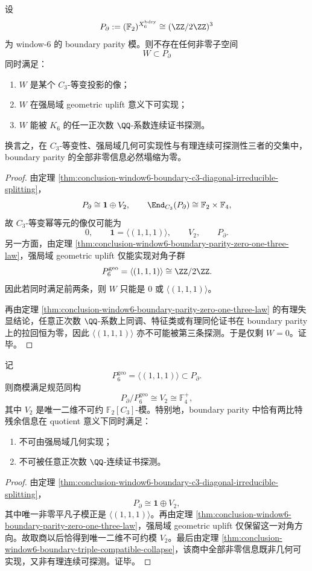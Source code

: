 \begin{theorem}\label{thm:conclusion-window6-boundary-triple-compatible-collapse}
设
\[
P_{\partial}:=(\mathbb F_2)^{X_6^{\mathrm{bdry}}}\cong (\ZZ/2\ZZ)^3
\]
为 window-\(6\) 的 boundary parity 模。则不存在任何非零子空间
\[
W\subset P_{\partial}
\]
同时满足：
\begin{enumerate}
  \item \(W\) 是某个 \(C_3\)-等变投影的像；
  \item \(W\) 在强局域 geometric uplift 意义下可实现；
  \item \(W\) 能被 \(K_6\) 的任一正次数 \(\QQ\)-系数连续证书探测。
\end{enumerate}
换言之，在 \(C_3\)-等变性、强局域几何可实现性与有理连续可探测性三者的交集中，boundary parity 的全部非零信息必然塌缩为零。
\end{theorem}
\begin{proof}
由定理 \ref{thm:conclusion-window6-boundary-c3-diagonal-irreducible-splitting}，
\[
P_{\partial}\cong \mathbf 1\oplus V_2,
\qquad
\End_{C_3}(P_{\partial})\cong \mathbb F_2\times \mathbb F_4,
\]
故 \(C_3\)-等变幂等元的像仅可能为
\[
0,\qquad \mathbf 1=\langle(1,1,1)\rangle,\qquad V_2,\qquad P_{\partial}.
\]
另一方面，由定理 \ref{thm:conclusion-window6-boundary-parity-zero-one-three-law}，强局域 geometric uplift 仅能实现对角子群
\[
P_6^{\mathrm{geo}}=\langle(1,1,1)\rangle\cong \ZZ/2\ZZ.
\]
因此若同时满足前两条，则 \(W\) 只能是 \(0\) 或 \(\langle(1,1,1)\rangle\)。

再由定理 \ref{thm:conclusion-window6-boundary-parity-zero-one-three-law} 的有理失显结论，任意正次数 \(\QQ\)-系数上同调、特征类或有理同伦证书在 boundary parity 上的拉回恒为零，因此 \(\langle(1,1,1)\rangle\) 亦不可能被第三条探测。于是仅剩 \(W=0\)。证毕。
\end{proof}

\begin{corollary}[唯一二维不可约不可见商]\label{cor:conclusion-window6-boundary-unique-invisible-v2-quotient}
记
\[
P_6^{\mathrm{geo}}=\langle(1,1,1)\rangle\subset P_{\partial}.
\]
则商模满足规范同构
\[
P_{\partial}/P_6^{\mathrm{geo}}\cong V_2\cong \mathbb F_4^+,
\]
其中 \(V_2\) 是唯一二维不可约 \(\mathbb F_2[C_3]\)-模。特别地，boundary parity 中恰有两比特残余信息在 quotient 意义下同时满足：
\begin{enumerate}
  \item 不可由强局域几何实现；
  \item 不可被任意正次数 \(\QQ\)-连续证书探测。
\end{enumerate}
\end{corollary}
\begin{proof}
由定理 \ref{thm:conclusion-window6-boundary-c3-diagonal-irreducible-splitting}，
\[
P_{\partial}\cong \mathbf 1\oplus V_2,
\]
其中唯一非零平凡子模正是 \(\langle(1,1,1)\rangle\)。再由定理 \ref{thm:conclusion-window6-boundary-parity-zero-one-three-law}，强局域 geometric uplift 仅保留这一对角方向。故取商以后恰得到唯一二维不可约模 \(V_2\)。最后由定理 \ref{thm:conclusion-window6-boundary-triple-compatible-collapse}，该商中全部非零信息既非几何可实现，又非有理连续可探测。证毕。
\end{proof}

